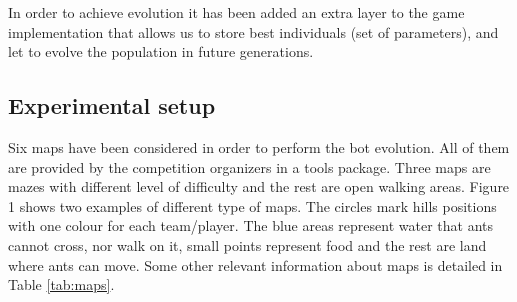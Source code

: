 \documentclass[runningheads]{llncs}
\begin{document}
 
 
 
 

In order to achieve evolution it has been added an extra layer to the game implementation that allows us to store best individuals (set of parameters), and let to evolve the population in future generations. 

\subsection{Experimental setup}
Six maps have been considered in order to perform the bot evolution. All of them are provided by the competition organizers in a tools package. Three maps are mazes with different level of difficulty and the rest are open walking areas. Figure 1 shows two examples of different type of maps. The circles mark hills positions with one colour for each team/player. The blue areas represent water that ants cannot cross, nor walk on it, small points represent food and the rest are land where ants can move. Some other relevant information about maps is detailed in Table \ref{tab:maps}. 



\end{document}
